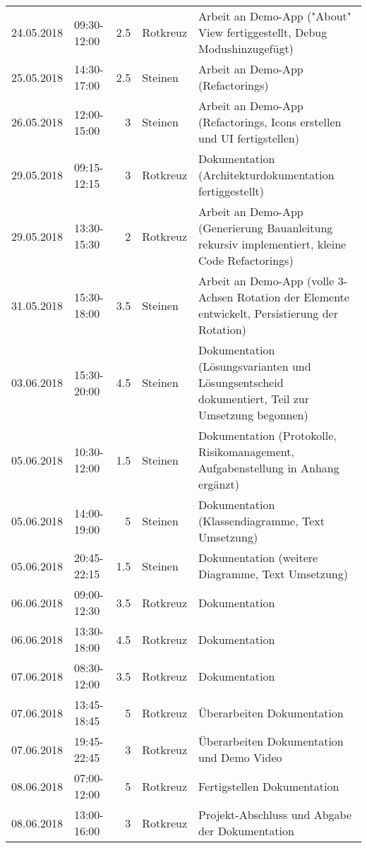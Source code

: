 \begin{longtable}{llrlp{7cm}}
	24.05.2018 & 09:30-12:00 & 2.5    & Rotkreuz & Arbeit an Demo-App ("About" View fertiggestellt, Debug Modushinzugefügt) \\
	25.05.2018 & 14:30-17:00 & 2.5    & Steinen & Arbeit an Demo-App (Refactorings) \\
	26.05.2018 & 12:00-15:00 & 3      & Steinen & Arbeit an Demo-App (Refactorings, Icons erstellen und UI fertigstellen) \\
	29.05.2018 & 09:15-12:15 & 3      & Rotkreuz & Dokumentation (Architekturdokumentation fertiggestellt) \\
	29.05.2018 & 13:30-15:30 & 2      & Rotkreuz & Arbeit an Demo-App (Generierung Bauanleitung rekursiv implementiert, kleine Code Refactorings) \\
	31.05.2018 & 15:30-18:00 & 3.5    & Steinen & Arbeit an Demo-App (volle 3-Achsen Rotation der Elemente entwickelt, Persistierung der Rotation) \\
	03.06.2018 & 15:30-20:00 & 4.5    & Steinen & Dokumentation (Lösungsvarianten und Lösungsentscheid dokumentiert, Teil zur Umsetzung begonnen) \\
	05.06.2018 & 10:30-12:00 & 1.5    & Steinen & Dokumentation (Protokolle, Risikomanagement, Aufgabenstellung in Anhang ergänzt) \\
	05.06.2018 & 14:00-19:00 & 5      & Steinen & Dokumentation (Klassendiagramme, Text Umsetzung) \\
	05.06.2018 & 20:45-22:15 & 1.5    & Steinen & Dokumentation (weitere Diagramme, Text Umsetzung) \\
	06.06.2018 & 09:00-12:30 & 3.5    & Rotkreuz & Dokumentation \\
	06.06.2018 & 13:30-18:00 & 4.5    & Rotkreuz & Dokumentation \\
	07.06.2018 & 08:30-12:00 & 3.5    & Rotkreuz & Dokumentation \\
	07.06.2018 & 13:45-18:45 & 5      & Rotkreuz & Überarbeiten Dokumentation \\
	07.06.2018 & 19:45-22:45 & 3      & Rotkreuz & Überarbeiten Dokumentation und Demo Video \\
	08.06.2018 & 07:00-12:00 & 5      & Rotkreuz & Fertigstellen Dokumentation \\
	08.06.2018 & 13:00-16:00 & 3      & Rotkreuz & Projekt-Abschluss und Abgabe der Dokumentation \\
	\hline
\end{longtable}
